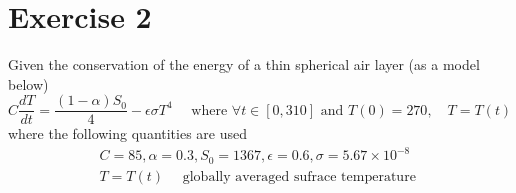 \documentclass[12pt,a4paper]{article}
\begin{document}
\section*{Exercise 2}
Given the conservation of the energy of a thin spherical air layer (as a model below)
\begin{equation}
C \frac{dT}{dt}    =  \frac{  (1 - \alpha ) S_0}{ 4}    -  \epsilon  \sigma   T^4  \quad \text{ where }   \forall t \in  [0,310] \text{ and } T(0)  =  270 , \quad T  =  T(t)
    \label{eq:ebm}
\end{equation}
where the following quantities are used
\begin{align*}
    C  =  85, \alpha =  0.3,  S_0   =  1367,  \epsilon   = 0.6,  \sigma =   5.67 \times 10^{-8} \\
    T  = T(t)  \quad \text{ globally averaged sufrace temperature }
\end{align*}
\end{document}
